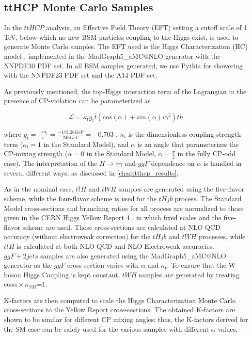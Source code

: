 \subsection{ttHCP Monte Carlo Samples} \label{sec:ttHCPMC} 

In the $ttH CP$ analysis, an Effective Field Theory (EFT) setting a cutoff scale of 1 TeV, below which no new BSM particles coupling to the Higgs exist, is used to generate Monte Carlo samples. The EFT used is the Higgs Characterization (HC) model \cite{HC}, implemented in the MadGraph5\_aMC@NLO generator with the NNPDF30 PDF set. In all BSM samples generated, we use Pythia for showering with the NNPDF23 PDF set and the A14 PDF set.

As previously mentioned, the top-Higgs interaction term of the Lagrangian in the presence of CP-violation can be parameterized as

\begin{equation}
\mathcal{L} = \kappa_{t} g_{t} \bar{t} (cos(\alpha)+ sin(\alpha) i \gamma^{5} )th
\end{equation}

where $g_{t} = \frac{-m_{t}}{v} = \frac{-173.26 GeV}{246 GeV} = -0.703$ , $\kappa_{t}$ is the dimensionless coupling-strength term ($\kappa_{t}= 1$ in the Standard Model), and $\alpha$ is an angle that parameterizes the CP-mixing strength ($\alpha = 0$ in the Standard Model, $\alpha = \frac{\pi}{2}$ in the fully CP-odd case). The interpretation of the $H \rightarrow \gamma \gamma$ and $ggF$ dependence on $\alpha$ is handled in several different ways, as discussed in \ref{chap:tthcp_results}.

As in the nominal case, $t\bar{t}H$ and $tWH$ samples are generated using the five-flavor scheme, while the four-flavor scheme is used for the $tHjb$ process. The Standard Model cross-sections and branching ratios for all process are normalized to those given in the CERN Higgs Yellow Report 4 \cite{YellowReport4}, in which fixed scales and the five-flavor scheme are used. Those cross-sections are calculated at NLO QCD accuracy (without electroweak correction) for the $tHjb$ and $tWH$ processes, while $t\bar{t}H$ is calculated at both NLO QCD and NLO Electroweak accuracies. $ggF+ 2 jets$ samples are also generated using the MadGraph5\_aMC@NLO generator as the $ggF$ cross-section varies with $\alpha$ and $\kappa_{t}$. To ensure that the W-boson Higgs Coupling is kept constant, $tWH$ samples are generated by treating cos$\alpha \times \kappa_{SM}$=1.


K-factors are then computed to scale the Higgs Characterization Monte Carlo cross-sections to the Yellow Report cross-sections. The obtained K-factors are shown to be similar for different CP mixing angles; thus, the K-factors derived for the SM case can be safely used for the various samples with different $\alpha$ values. 


